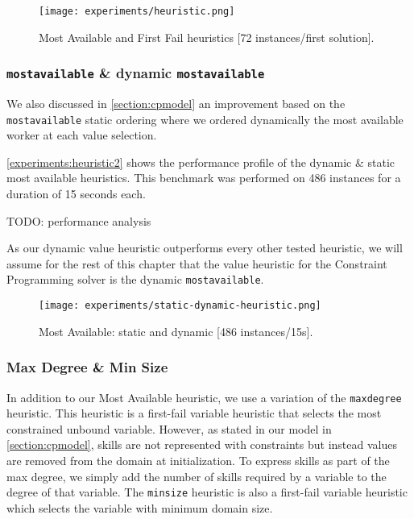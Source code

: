 \documentclass[../../thesis.tex]{subfiles}
\begin{document}
\begin{figure}
  \centering
  \texttt{[image: experiments/heuristic.png]}
  \caption{Most Available and First Fail heuristics [72 instances/first solution].}
  \label{experiments:heuristic1}
\end{figure}


\subsubsection{\texttt{mostavailable} \& dynamic \texttt{mostavailable}}

We also discussed in \autoref{section:cpmodel} an improvement based on the \texttt{mostavailable} static ordering
where we ordered dynamically the most available worker at each value selection.

\autoref{experiments:heuristic2} shows the performance profile of the dynamic \& static most available heuristics.
This benchmark was performed on 486 instances for a duration of 15 seconds each.

TODO: performance analysis



As our dynamic value heuristic outperforms every other tested heuristic, we will assume for the rest of this chapter 
that the value heuristic for the Constraint Programming solver is the dynamic \texttt{mostavailable}.



\begin{figure}
  \centering
  \texttt{[image: experiments/static-dynamic-heuristic.png]}
  \caption{Most Available: static and dynamic [486 instances/15s].}
  \label{experiments:heuristic2}
\end{figure}


\subsubsection{Max Degree \& Min Size}

In addition to our Most Available heuristic, we use a variation of the \texttt{maxdegree} heuristic. 
This heuristic is a first-fail variable heuristic that selects the most constrained unbound variable. However,
as stated in our model in \autoref{section:cpmodel}, skills are not represented with constraints but instead values 
are removed from the domain at initialization. To express skills as part of the max degree, we simply add the number of 
skills required by a variable to the degree of that variable. The \texttt{minsize} heuristic is also a first-fail variable heuristic which 
selects the variable with minimum domain size.
\end{document}
